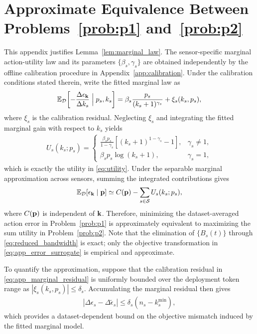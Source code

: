 \documentclass[lettersize,journal]{IEEEtran}
\theoremstyle{custom}
\begin{document}
\section{Approximate Equivalence Between Problems~\ref{prob:p1} and~\ref{prob:p2}}\label{app:equivalence}
This appendix justifies Lemma~\ref{lem:marginal_law}. The sensor-specific marginal action-utility law and its parameters $\{\beta_s,\gamma_s\}$ are obtained independently by the offline calibration procedure in Appendix~\ref{app:calibration}. Under the calibration conditions stated therein, write the fitted marginal law as
\begin{align}\label{eq:app_marginal_residual}
    \mathbb E_{\mathcal D}\!\left[
    -\frac{\Delta\epsilon_{\bf k}}{\Delta k_s}
    \Bigm|p_s,k_s\right]
    =\beta_s\frac{p_s}{(k_s+1)^{\gamma_s}}+\xi_s(k_s,p_s),
\end{align}
where $\xi_s$ is the calibration residual. Neglecting $\xi_s$ and integrating the fitted marginal gain with respect to $k_s$ yields
\begin{align}
    U_s(k_s;p_s)=
    \begin{cases}
    \displaystyle\frac{\beta_s p_s}{1-\gamma_s}
    \left[(k_s+1)^{1-\gamma_s}-1\right], & \gamma_s\neq1,\\[1.5mm]
    \displaystyle\beta_s p_s\log(k_s+1), & \gamma_s=1,
    \end{cases}
\end{align}
which is exactly the utility in \eqref{eq:utility}. Under the separable marginal approximation across sensors, summing the integrated contributions gives
\begin{align}\label{eq:app_error_surrogate}
    \mathbb E_{\mathcal D}[\epsilon_{\bf k}\mid{\bf p}]
    \simeq C({\bf p})-\sum_{s\in\mathcal S}U_s(k_s;p_s),
\end{align}
where $C({\bf p})$ is independent of ${\bf k}$. Therefore, minimizing the dataset-averaged action error in Problem~\ref{prob:p1} is approximately equivalent to maximizing the sum utility in Problem~\ref{prob:p2}. Note that the elimination of $\{B_s(t)\}$ through \eqref{eq:reduced_bandwidth} is exact; only the objective transformation in \eqref{eq:app_error_surrogate} is empirical and approximate.

To quantify the approximation, suppose that the calibration residual in \eqref{eq:app_marginal_residual} is uniformly bounded over the deployment token range as $|\xi_s(k_s,p_s)|\leq\delta_s$. Accumulating the marginal residual then gives
\begin{align}
    \left|\Delta\epsilon_s-\Delta\widetilde\epsilon_s\right|
    \leq \delta_s\left(n_s-k_s^{\min}\right),
\end{align}
which provides a dataset-dependent bound on the objective mismatch induced by the fitted marginal model.
\end{document}
